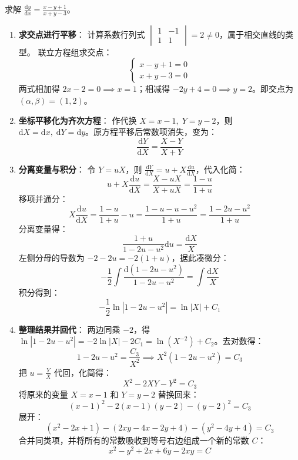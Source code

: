 \documentclass[lang=cn,11pt]{elegantbook}
\begin{document}
\begin{exercise} \label{ex:ode-intersect-line}
求解 $\displaystyle\frac{\mathrm{d}y}{\mathrm{d}x}=\frac{x-y+1}{x+y-3}$。
\end{exercise}
\begin{solution}
\begin{enumerate}
    \item \textbf{求交点进行平移}：
    计算系数行列式 $\begin{vmatrix}1 & -1 \\ 1 & 1\end{vmatrix} = 2 \neq 0$，属于相交直线的类型。
    联立方程组求交点：
    \[
    \begin{cases}
    x-y+1=0\\
    x+y-3=0
    \end{cases}
    \]
    两式相加得 $2x-2=0 \implies x=1$；相减得 $-2y+4=0 \implies y=2$。即交点为 $(\alpha, \beta) = (1,2)$。
    
    \item \textbf{坐标平移化为齐次方程}：
    作代换 $X=x-1,\;Y=y-2$，则 $\mathrm{d}X=\mathrm{d}x,\;\mathrm{d}Y=\mathrm{d}y$。原方程平移后常数项消失，变为：
    \[
    \frac{\mathrm{d}Y}{\mathrm{d}X}=\frac{X-Y}{X+Y}
    \]
    
    \item \textbf{分离变量与积分}：
    令 $Y=uX$，则 $\frac{\mathrm{d}Y}{\mathrm{d}X} = u+X\frac{\mathrm{d}u}{\mathrm{d}X}$，代入化简：
    \[
    u+X\frac{\mathrm{d}u}{\mathrm{d}X} = \frac{X-uX}{X+uX} = \frac{1-u}{1+u}
    \]
    移项并通分：
    \[
    X\frac{\mathrm{d}u}{\mathrm{d}X} = \frac{1-u}{1+u} - u = \frac{1-u-u-u^2}{1+u} = \frac{1-2u-u^2}{1+u}
    \]
    分离变量得：
    \[
    \frac{1+u}{1-2u-u^2}\mathrm{d}u = \frac{\mathrm{d}X}{X}
    \]
    左侧分母的导数为 $-2-2u = -2(1+u)$，据此凑微分：
    \[
    -\frac{1}{2} \int \frac{\mathrm{d}(1-2u-u^2)}{1-2u-u^2} = \int \frac{\mathrm{d}X}{X}
    \]
    积分得到：
    \[
    -\frac{1}{2}\ln|1-2u-u^2| = \ln|X| + C_1
    \]
    
    \item \textbf{整理结果并回代}：
    两边同乘 $-2$，得 $\ln|1-2u-u^2| = -2\ln|X| - 2C_1 = \ln(X^{-2}) + C_2$。去对数得：
    \[
    1-2u-u^2 = \frac{C_3}{X^2} \implies X^2(1-2u-u^2) = C_3
    \]
    把 $u = \frac{Y}{X}$ 代回，化简得：
    \[
    X^2 - 2XY - Y^2 = C_3
    \]
    将原来的变量 $X = x-1$ 和 $Y = y-2$ 替换回来：
    \[
    (x-1)^2 - 2(x-1)(y-2) - (y-2)^2 = C_3
    \]
    展开：
    \[
    (x^2-2x+1) - (2xy-4x-2y+4) - (y^2-4y+4) = C_3
    \]
    合并同类项，并将所有的常数吸收到等号右边组成一个新的常数 $C$：
    \[
    \boxed{x^{2}-y^{2}+2x+6y-2xy=C}
    \]
\end{enumerate}
\end{solution}
\end{document}
